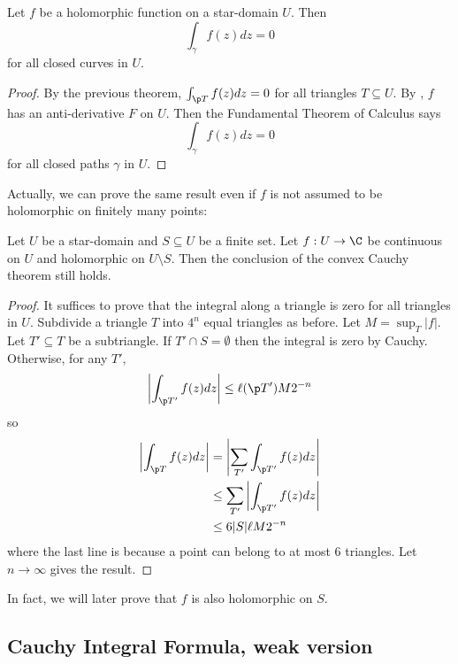 \documentclass[a4paper]{article}
\begin{document}
\begin{corollary}
  Let \(f\) be a holomorphic function on a star-domain \(U\). Then
  \[
    \int_\gamma f(z)dz = 0
  \]
  for all closed curves in \(U\).
\end{corollary}

\begin{proof}
  By the previous theorem, \(\int_{\p T} f(z)dz = 0\) for all triangles \(T \subseteq U\). By , \(f\) has an anti-derivative \(F\) on \(U\). Then the Fundamental Theorem of Calculus says
  \[
    \int_\gamma f(z)dz = 0
  \]
  for all closed paths \(\gamma\) in \(U\).
\end{proof}

Actually, we can prove the same result even if \(f\) is not assumed to be holomorphic on finitely many points:

\begin{proposition}
  \label{prop:Cauchy with holes}
  Let \(U\) be a star-domain and \(S \subseteq U\) be a finite set. Let \(f: U \to \C\) be continuous on \(U\) and holomorphic on \(U \setminus S\). Then the conclusion of the convex Cauchy theorem still holds.
\end{proposition}

\begin{proof}
  It suffices to prove that the integral along a triangle is zero for all triangles in \(U\). Subdivide a triangle \(T\) into \(4^n\) equal triangles as before. Let \(M = \sup_T |f|\). Let \(T' \subseteq T\) be a subtriangle. If \(T' \cap S = \emptyset\) then the integral is zero by Cauchy. Otherwise, for any \(T'\),
  \[
    \left| \int_{\p T'} f(z)dz \right| \leq \ell(\p T') M 2^{-n} 
  \]
  so
  \begin{align*}
    \left| \int_{\p T} f(z)dz \right|
    &= \left|\sum_{T'} \int_{\p T'} f(z) dz \right| \\
    &\leq \sum_{T'}\left| \int_{\p T'} f(z)dz \right| \\
    &\leq 6|S|\ell M 2^{-n}
  \end{align*}
  where the last line is because a point can belong to at most \(6\) triangles. Let \(n \to \infty\) gives the result.
\end{proof}

In fact, we will later prove that \(f\) is also holomorphic on \(S\).

\subsection{Cauchy Integral Formula, weak version}
\end{document}
